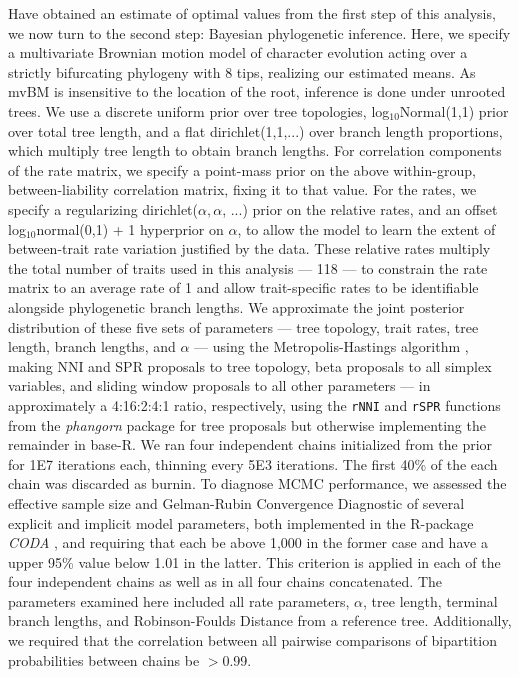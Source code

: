 \documentclass[12pt, twocolumn, twoside]{article}
\begin{document}
Have obtained an estimate of optimal values from the first step of this analysis, we now turn to the second step: Bayesian phylogenetic inference. Here, we specify a multivariate Brownian motion model of character evolution acting over a strictly bifurcating phylogeny with 8 tips, realizing our estimated means. As mvBM is insensitive to the location of the root, inference is done under unrooted trees. We use a discrete uniform prior over tree topologies, log$_{10}$Normal(1,1) prior over total tree length, and a flat dirichlet(1,1,...) over branch length proportions, which multiply tree length to obtain branch lengths. For correlation components of the rate matrix, we specify a point-mass prior on the above within-group, between-liability correlation matrix, fixing it to that value. For the rates, we specify a regularizing dirichlet($\alpha, \alpha$, ...) prior on the relative rates, and an offset log$_{10}$normal(0,1) + 1 hyperprior on $\alpha$, to allow the model to learn the extent of between-trait rate variation justified by the data. These relative rates multiply the total number of traits used in this analysis --- 118 --- to constrain the rate matrix to an average rate of 1 and allow trait-specific rates to be identifiable alongside phylogenetic branch lengths. We approximate the joint posterior distribution of these five sets of parameters --- tree topology, trait rates, tree length, branch lengths, and $\alpha$ --- using the Metropolis-Hastings algorithm \citep{hastingsMonteCarloSampling1970}, making NNI and SPR proposals to tree topology, beta proposals to all simplex variables, and sliding window proposals to all other parameters --- in approximately a 4:16:2:4:1 ratio, respectively, using the \texttt{rNNI} and \texttt{rSPR} functions from the \textit{phangorn} \citep{schliepPhangornPhylogeneticAnalysis2011} package for tree proposals but otherwise implementing the remainder in base-R. We ran four independent chains initialized from the prior for 1E7 iterations each, thinning every 5E3 iterations. The first 40\% of the each chain was discarded as burnin. To diagnose MCMC performance, we assessed the effective sample size and Gelman-Rubin Convergence Diagnostic \citep{gelmanInferenceIterativeSimulation1992} of several explicit and implicit model parameters, both implemented in the R-package \textit{CODA} \citep{plummerCODAConvergenceDiagnosis2006}, and requiring that each be above 1,000 in the former case and have a upper 95\% value below 1.01 in the latter. This criterion is applied in each of the four independent chains as well as in all four chains concatenated. The parameters examined here included all rate parameters, $\alpha$, tree length, terminal branch lengths, and Robinson-Foulds Distance \citep{robinsonComparisonPhylogeneticTrees1981} from a reference tree. Additionally, we required that the correlation between all pairwise comparisons of bipartition probabilities between chains be $>$0.99.
\end{document}
